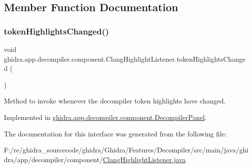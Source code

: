 \subsection{Member Function Documentation}
\mbox{\label{interfaceghidra_1_1app_1_1decompiler_1_1component_1_1_clang_highlight_listener_a658c0e626c607be6fa4206374bd861fa}} 
\subsubsection{\texorpdfstring{tokenHighlightsChanged()}{tokenHighlightsChanged()}}
{\footnotesize\ttfamily void ghidra.\+app.\+decompiler.\+component.\+Clang\+Highlight\+Listener.\+token\+Highlights\+Changed (\begin{DoxyParamCaption}{ }\end{DoxyParamCaption})}

Method to invoke whenever the decompiler token highlights have changed. 

Implemented in \mbox{\hyperlink{classghidra_1_1app_1_1decompiler_1_1component_1_1_decompiler_panel_ac71275c734f1c34324845ed73ae91929}{ghidra.\+app.\+decompiler.\+component.\+Decompiler\+Panel}}.



The documentation for this interface was generated from the following file\+:\begin{DoxyCompactItemize}
\item 
F\+:/re/ghidra\+\_\+sourcecode/ghidra/\+Ghidra/\+Features/\+Decompiler/src/main/java/ghidra/app/decompiler/component/\mbox{\hyperlink{_clang_highlight_listener_8java}{Clang\+Highlight\+Listener.\+java}}\end{DoxyCompactItemize}
